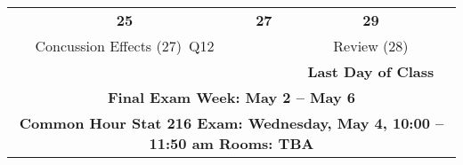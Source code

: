 \begin{center}
\begin{tabular}{|c|c|c|}
 \hfill\bf{25} & \hfill\bf{27} & \hfill\bf{29} \\
 \hfill  Concussion Effects \small{(27)}\  \hfill \small{\sf Q12}
 &
 & Review    \small{(28)}
\\
  & & \small\bf{ Last Day of Class}  \\ \hline

  \multicolumn{3}{|c|}{\textbf{Final Exam Week: May 2 -- May 6 }} \\
  \multicolumn{3}{|c|}{\bf{ Common Hour Stat 216  Exam: 
      Wednesday, May 4, 10:00 -- 11:50 am Rooms: TBA}} \\
\hline

\end{tabular}
\vspace{.2in} \\
\end{center}


